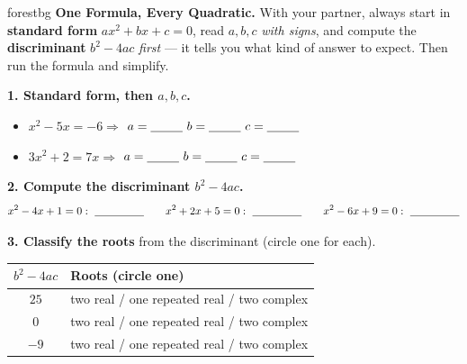 \documentclass[10pt]{article}
\begin{document}

\vspace{0.08in}

\begin{headlinebox}{forestbg}
\small\textbf{One Formula, Every Quadratic.} With your partner, always start in \textbf{standard form}
$ax^2+bx+c=0$, read $a,b,c$ \emph{with signs}, and compute the \textbf{discriminant} $b^2-4ac$ \emph{first}
--- it tells you what kind of answer to expect. Then run the formula and simplify.
\end{headlinebox}

\vspace{0.06in}

\begin{tcolorbox}[colback=white, colframe=black!40, title=\textbf{Tier R --- Remediate},
    fonttitle=\bfseries, arc=1.5mm, left=3mm, right=3mm, top=2mm, bottom=2mm, breakable]
\textbf{1. Standard form, then $a,b,c$.}
\begin{itemize}\setlength{\itemsep}{3pt}
  \item $x^2-5x=-6 \Rightarrow$ \blank{2.8cm} \hfill $a=\blank{0.9cm}\ b=\blank{0.9cm}\ c=\blank{0.9cm}$
  \item $3x^2+2=7x \Rightarrow$ \blank{2.8cm} \hfill $a=\blank{0.9cm}\ b=\blank{0.9cm}\ c=\blank{0.9cm}$
\end{itemize}

\textbf{2. Compute the discriminant $b^2-4ac$.}
\[ x^2-4x+1=0:\ \blank{1.6cm} \qquad x^2+2x+5=0:\ \blank{1.6cm} \qquad x^2-6x+9=0:\ \blank{1.6cm} \]

\textbf{3. Classify the roots} from the discriminant (circle one for each).
\begin{center}
\renewcommand{\arraystretch}{1.5}
\begin{tabularx}{\linewidth}{@{}c X@{}}
\textbf{$b^2-4ac$} & \textbf{Roots (circle one)} \\
\hline
$25$  & two real \quad / \quad one repeated real \quad / \quad two complex \\
$0$   & two real \quad / \quad one repeated real \quad / \quad two complex \\
$-9$  & two real \quad / \quad one repeated real \quad / \quad two complex \\
\end{tabularx}
\end{center}


\end{tcolorbox}
\end{document}
